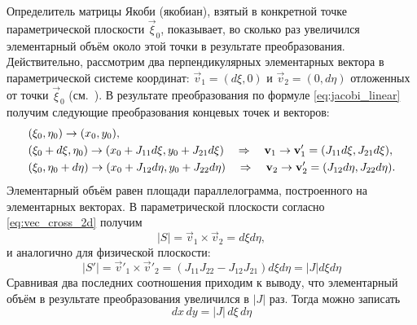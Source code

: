 Определитель матрицы Якоби (якобиан), взятый в конкретной точке параметрической плоскости $\vec\xi_0$, показывает,
во сколько раз увеличился элементарный объём около этой точки в результате преобразования.
Действительно, рассмотрим два перпендикулярных элементарных вектора
в параметрической системе координат: $\vec v_1 = (d\xi, 0)$ и $\vec v_2 = (0, d\eta)$
отложенных от точки $\vec\xi_0$ (см.~).
В результате преобразования по формуле \cref{eq:jacobi_linear} 
получим следующие преобразования концевых точек и векторов:
\begin{align*}
& (\xi_0, \eta_0) \to (x_0, y_0), \\
& (\xi_0 + d\xi, \eta_0) \to (x_0 + J_{11} d\xi, y_0 + J_{21} d\xi) \quad\Rightarrow\quad \boldsymbol{\rm v}_1 \to \boldsymbol{\rm v}'_1 = (J_{11} d\xi, J_{21} d\xi), \\
& (\xi_0 , \eta_0 + d\eta) \to (x_0 + J_{12} d\eta, y_0 + J_{22} d\eta) \quad\Rightarrow\quad \boldsymbol{\rm v}_2 \to \boldsymbol{\rm v}'_2 = (J_{12} d\eta, J_{22} d\eta).
\end{align*}
Элементарный объём равен площади параллелограмма, построенного
на элементарных векторах.
В параметрической плоскости согласно \cref{eq:vec_cross_2d} получим 
$$ |S| = \vec v_1 \times \vec v_2 = d\xi d\eta,$$
и аналогично для физической плоскости:
$$
|S'| = \vec v'_1 \times \vec v'_2 = (J_{11} J_{22} - J_{12} J_{21})d\xi d\eta = |J| d\xi d\eta
$$
Сравнивая два последних соотношения приходим к выводу,
что элементарный объём в результате преобразования увеличился в $|J|$ раз. Тогда можно записать
\begin{equation}
\label{eq:dxdy_dxideta}
dx\,dy = |J|\,d\xi\,d\eta
\end{equation}

